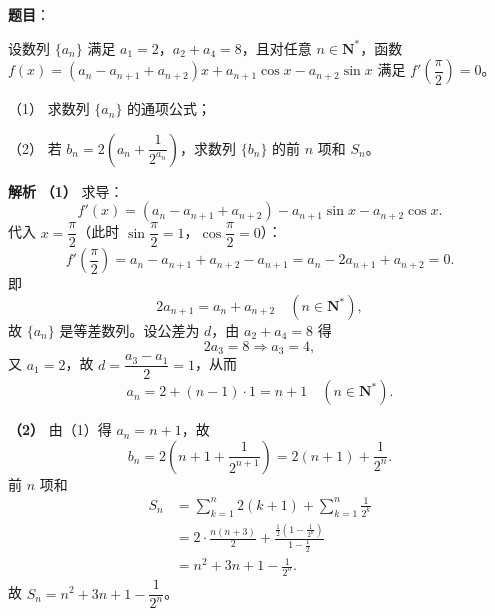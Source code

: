 \begin{answer}

\textbf{题目}：

设数列 $\{a_n\}$ 满足 $a_1=2$，$a_2+a_4=8$，且对任意 $n\in\mathbf N^*$，函数 $f(x)=(a_n-a_{n+1}+a_{n+2})x+a_{n+1}\cos x-a_{n+2}\sin x$ 满足 $f'\left(\dfrac\pi2\right)=0$。

（1） 求数列 $\{a_n\}$ 的通项公式；

（2） 若 $b_n=2\left(a_n+\dfrac1{2^{a_n}}\right)$，求数列 $\{b_n\}$ 的前 $n$ 项和 $S_n$。

\textbf{解析}
\textbf{（1）} 求导：
\nopagebreak[4]
\[f'(x)=(a_n-a_{n+1}+a_{n+2})-a_{n+1}\sin x-a_{n+2}\cos x.\]
代入 $x=\dfrac\pi2$（此时 $\sin\dfrac\pi2=1$，$\cos\dfrac\pi2=0$）：
\nopagebreak[4]
\[f'\left(\frac\pi2\right)=a_n-a_{n+1}+a_{n+2}-a_{n+1}=a_n-2a_{n+1}+a_{n+2}=0.\]
即
\nopagebreak[4]
\[2a_{n+1}=a_n+a_{n+2}\quad(n\in\mathbf N^*),\]
故 $\{a_n\}$ 是等差数列。设公差为 $d$，由 $a_2+a_4=8$ 得
\nopagebreak[4]
\[2a_3=8\Longrightarrow a_3=4,\]
又 $a_1=2$，故 $d=\dfrac{a_3-a_1}2=1$，从而
\nopagebreak[4]
\[a_n=2+(n-1)\cdot1=n+1\quad(n\in\mathbf N^*).\]

\textbf{（2）} 由（1）得 $a_n=n+1$，故
\nopagebreak[4]
\[b_n=2\left(n+1+\frac1{2^{n+1}}\right)=2(n+1)+\frac1{2^n}.\]
前 $n$ 项和
\nopagebreak[4]
\[\begin{aligned}
S_n&=\sum_{k=1}^{n}2(k+1)+\sum_{k=1}^{n}\frac1{2^k}\\
&=2\cdot\frac{n(n+3)}2+\frac{\frac12\left(1-\frac1{2^n}\right)}{1-\frac12}\\
&=n^2+3n+1-\frac1{2^n}.
\end{aligned}\]
故 $S_n=n^2+3n+1-\dfrac1{2^n}$。



\end{answer}
